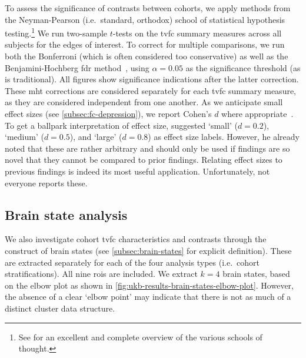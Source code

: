 To assess the significance of contrasts between cohorts, we apply methods from the Neyman-Pearson (i.e.~standard, orthodox) school of statistical hypothesis testing.\footnote{See \textcite{Dienes2008} for an excellent and complete overview of the various schools of thought.}
%
We run two-sample $t$-tests on the \gls{tvfc} summary measures across all subjects for the edges of interest.
To correct for multiple comparisons, we run both the Bonferroni (which is often considered too conservative) as well as the Benjamini-Hochberg \gls{fdr} method~\parencite{Benjamini1995}, using $\alpha = 0.05$ as the significance threshold (as is traditional).
All figures show significance indications after the latter correction.
These \gls{mht} corrections are considered separately for each \gls{tvfc} summary measure, as they are considered independent from one another.
%
As we anticipate small effect sizes (see \cref{subsec:fc-depression}), we report Cohen's $d$ where appropriate~\parencite{Cohen1988, Lakens2013}.
To get a ballpark interpretation of effect size, \textcite{Cohen1988} suggested `small' ($d = 0.2$), `medium' ($d = 0.5$), and `large' ($d = 0.8$) as effect size labels.
However, he already noted that these are rather arbitrary and should only be used if findings are so novel that they cannot be compared to prior findings.
Relating effect sizes to previous findings is indeed its most useful application.
Unfortunately, not everyone reports these.

\subsection{Brain state analysis}

We also investigate cohort \gls{tvfc} characteristics and contrasts through the construct of brain states (see \cref{subsec:brain-states} for explicit definition).
These are extracted separately for each of the four analysis types (i.e.~cohort stratifications).
All nine \glspl{roi} are included.
%
We extract $k = 4$ brain states, based on the elbow plot as shown in \cref{fig:ukb-results-brain-states-elbow-plot}.
However, the absence of a clear `elbow point' may indicate that there is not as much of a distinct cluster data structure.


